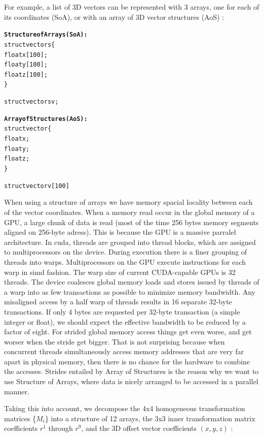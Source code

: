 \documentclass[12pt,journal,compsoc]{IEEEtran}
\begin{document}
For example, a list of 3D vectors can be represented with 3 arrays, one for each of its coordinates (SoA), or with an array of 3D vector structures (AoS) :

\begin{samepage}
\begin{alltt}
\textbf{Structure of Arrays (SoA):}
struct vectors \{
    float x[100];
    float y[100];
    float z[100];
\}

struct vectors v;

\textbf{Array of Structures (AoS):}
struct vector \{
    float x;
    float y;
    float z;
\}

struct vector v[100]
\end{alltt}
\end{samepage}

When using a structure of arrays we have memory spacial locality between each of the vector coordinates. When a memory read occur in the global memory of a GPU, a large chunk of data is read (most of the time 256 bytes memory segments aligned on 256-byte adress). This is because the GPU is a massive parralel architecture.
In \ac{cuda}, threads are grouped into thread blocks, which are assigned to multiprocessors on the device. During execution there is a finer grouping of threads into warps. Multiprocessors on the GPU execute instructions for each warp in \acl{simd} fashion. The warp size of current CUDA-capable GPUs is 32 threads. 
The device coalesces global memory loads and stores issued by threads of a warp into as few transactions as possible to minimize memory bandwidth.
Any misaligned access by a half warp of threads results in 16 separate 32-byte transactions. If only 4 bytes are requested per 32-byte transaction (a simple integer or float), we should expect the effective bandwidth to be reduced by a factor of eight.
For strided global memory access things get even worse, and get worser when the stride get bigger.
That is not surprising because when concurrent threads simultaneously access memory addresses that are very far apart in physical memory, then there is no chance for the hardware to combine the accesses.
Strides entailed by Array of Structures is the reason why we want to use Structure of Arrays, where data is nicely arranged to be accessed in a parallel manner.

Taking this into account, we decompose the 4x4 homogeneous transformation matrices \{$M_i$\} into a structure of 12 arrays, the 3x3 inner transformation matrix coefficients $r^1$ through $r^9$, and the 3D offset vector coefficients $(x,y,z)$ :
\end{document}
